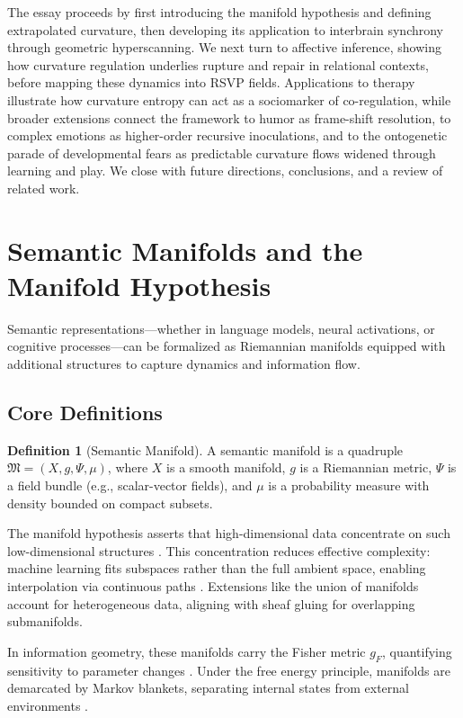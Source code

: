 \documentclass{article}
\theoremstyle{definition}
\newtheorem{definition}{Definition}[section]
\begin{document}
The essay proceeds by first introducing the manifold hypothesis and defining extrapolated curvature, then developing its application to interbrain synchrony through geometric hyperscanning. We next turn to affective inference, showing how curvature regulation underlies rupture and repair in relational contexts, before mapping these dynamics into RSVP fields. Applications to therapy illustrate how curvature entropy can act as a sociomarker of co-regulation, while broader extensions connect the framework to humor as frame-shift resolution, to complex emotions as higher-order recursive inoculations, and to the ontogenetic parade of developmental fears as predictable curvature flows widened through learning and play. We close with future directions, conclusions, and a review of related work.


\section{Semantic Manifolds and the Manifold Hypothesis}

Semantic representations—whether in language models, neural activations, or cognitive processes—can be formalized as Riemannian manifolds equipped with additional structures to capture dynamics and information flow.

\subsection{Core Definitions}

\begin{definition}[Semantic Manifold]
A semantic manifold is a quadruple $\mathfrak{M} = (X, g, \Psi, \mu)$, where $X$ is a smooth manifold, $g$ is a Riemannian metric, $\Psi$ is a field bundle (e.g., scalar-vector fields), and $\mu$ is a probability measure with density bounded on compact subsets.
\end{definition}

The manifold hypothesis asserts that high-dimensional data concentrate on such low-dimensional structures \cite{fefferman2016testing,gorban2018blessing}. This concentration reduces effective complexity: machine learning fits subspaces rather than the full ambient space, enabling interpolation via continuous paths \cite{chollet2021deep}. Extensions like the union of manifolds \cite{brown2023union} account for heterogeneous data, aligning with sheaf gluing for overlapping submanifolds.

In information geometry, these manifolds carry the Fisher metric $g_F$, quantifying sensitivity to parameter changes \cite{caticha2015geometry}. Under the free energy principle, manifolds are demarcated by Markov blankets, separating internal states from external environments \cite{kirchhoff2018markov}.
\end{document}
